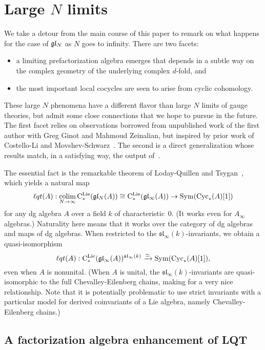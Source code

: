 \section{Large $N$ limits} \label{sec: largeN}


\def\cycls{{\rm Cyc}_*}
\def\lqt{{\ell q t}}
\def\colim{{\rm colim}}
\def\sl{\mathfrak{sl}}

We take a detour from the main course of this paper to remark on what happens for the case of $\mathfrak{g} \mathfrak{l}_N$ as $N$ goes to infinity.
There are two facets: 
\begin{itemize}
\item a limiting prefactorization algebra emerges that depends in a subtle way on the complex geometry of the underlying complex $d$-fold, and
\item the most important local cocycles are seen to arise from cyclic cohomology.
\end{itemize}
These large $N$ phenomena have a different flavor than large $N$ limits of gauge theories,
but admit some close connections that we hope to pursue in the future.
The first facet relies on observations borrowed from unpublished work of the first author with Greg Ginot and Mahmoud Zeinalian,
but inspired by prior work of Costello-Li \cite{CLbcov2} and Movshev-Schwarz~\cite{MovSch}.
The second is a direct generalization \cite{CLbcov2} whose results match, in a satisfying way, the output of~\cite{FHK}.

The essential fact is the remarkable theorem of Loday-Quillen \cite{LQ} and Tsygan~\cite{Tsy},
which yields a natural map 
\[
\lqt(A) : \underset{N \to \infty}{\colim} \, \cliels(\gl_N(A)) \cong \cliels(\gl_\infty(A)) \to \Sym(\cycls(A)[1])
\]
for any dg algebra $A$ over a field $k$ of characteristic~0.
(It works even for $A_\infty$ algebras.)
Naturality here means that it works over the category of dg algebras and maps of dg algebras.
When restricted to the $\sl_\infty(k)$-invariants, we obtain a quasi-isomorphism
\[
\lqt(A) :\cliels(\gl_\infty(A))^{\sl_\infty(k)} \xto{\simeq} \Sym(\cycls(A)[1]),
\]
even when $A$ is nonunital. 
(When $A$ is unital, the $\sl_\infty(k)$-invariants are quasi-isomorphic to the full Chevalley-Eilenberg chains,
making for a very nice relationship. 
Note that it is potentially problematic to use strict invariants with a particular model for derived coinvariants of a Lie algebra,
namely Chevalley-Eilenberg chains.)

\subsection{A factorization algebra enhancement of LQT}

